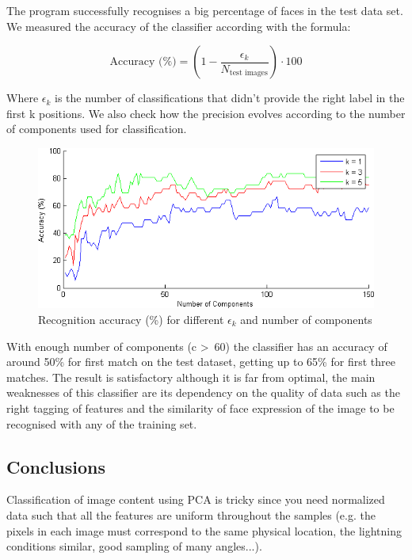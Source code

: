 \documentclass[12pt,a4paper,titlepage]{article}
\begin{document}
The program successfully recognises a big percentage of faces in the test data set. We measured the accuracy of the classifier according with the formula:

\begin{equation}
	\text{Accuracy (\%)} = \left(1 - \dfrac{\epsilon_k}{N_{\text{test images}}}\right) \cdot 100
\end{equation}

Where $\epsilon_k$ is the number of classifications that didn't provide the right label in the first k positions. We also check how the precision evolves according to the number of components used for classification.

\begin{figure}[H]
	\centering
	\includegraphics[width=1.0\textwidth]{accuracy}
	\caption{Recognition accuracy (\%) for different  $\epsilon_k$ and number of components}
\end{figure}

With enough number of components (c \textgreater~60) the classifier has an accuracy of around 50\% for first match on the test dataset, getting up to 65\% for first three matches. The result is satisfactory although it is far from optimal, the main weaknesses of this classifier are its dependency on the quality of data such as the right tagging of features and the similarity of face expression of the image to be recognised with any of the training set.

\subsection{Conclusions}
Classification of image content using PCA is tricky since you need normalized data such that all the features are uniform throughout the samples (e.g. the pixels in each image must correspond to the same physical location, the lightning conditions similar, good sampling of many angles...). 
\end{document}
